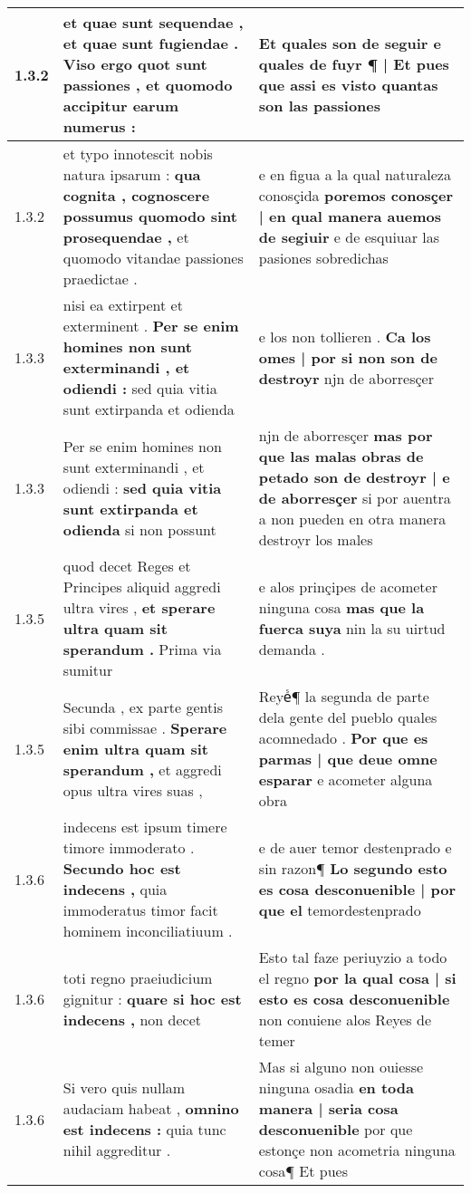 \begin{tabular}{|p{1cm}|p{6.5cm}|p{6.5cm}|}
1.3.2 & et quae sunt sequendae , \textbf{ et quae sunt fugiendae . } Viso ergo quot sunt passiones , et quomodo accipitur earum numerus : & Et quales son de seguir \textbf{ e quales de fuyr ¶ | Et pues que assi es visto } quantas son las passiones \\\hline
1.3.2 & et typo innotescit nobis natura ipsarum : \textbf{ qua cognita , cognoscere possumus quomodo sint prosequendae , } et quomodo vitandae passiones praedictae . & e en figua a la qual naturaleza conosçida \textbf{ poremos conosçer | en qual manera auemos de segiuir } e de esquiuar las pasiones sobredichas \\\hline
1.3.3 & nisi ea extirpent et exterminent . \textbf{ Per se enim homines non sunt exterminandi , et odiendi : } sed quia vitia sunt extirpanda et odienda & e los non tollieren . \textbf{ Ca los omes | por si non son de destroyr } njn de aborresçer \\\hline
1.3.3 & Per se enim homines non sunt exterminandi , et odiendi : \textbf{ sed quia vitia sunt extirpanda et odienda } si non possunt & njn de aborresçer \textbf{ mas por que las malas obras de petado son de destroyr | e de aborresçer } si por auentra a non pueden en otra manera destroyr los males \\\hline
1.3.5 & quod decet Reges et Principes aliquid aggredi ultra vires , \textbf{ et sperare ultra quam sit sperandum . } Prima via sumitur & e alos prinçipes de acometer ninguna cosa \textbf{ mas que la fuerca suya } nin la su uirtud demanda . \\\hline
1.3.5 & Secunda , ex parte gentis sibi commissae . \textbf{ Sperare enim ultra quam sit sperandum , } et aggredi opus ultra vires suas , & Reyeᷤ¶ la segunda de parte dela gente del pueblo quales acomnedado . \textbf{ Por que es parmas | que deue omne esparar } e acometer alguna obra \\\hline
1.3.6 & indecens est ipsum timere timore immoderato . \textbf{ Secundo hoc est indecens , } quia immoderatus timor facit hominem inconciliatiuum . & e de auer temor destenprado e sin razon¶ \textbf{ Lo segundo esto es cosa desconuenible | por que el } temordestenprado \\\hline
1.3.6 & toti regno praeiudicium gignitur : \textbf{ quare si hoc est indecens , } non decet & Esto tal faze periuyzio a todo el regno \textbf{ por la qual cosa | si esto es cosa desconuenible } non conuiene alos Reyes de temer \\\hline
1.3.6 & Si vero quis nullam audaciam habeat , \textbf{ omnino est indecens : } quia tunc nihil aggreditur . & Mas si alguno non ouiesse ninguna osadia \textbf{ en toda manera | seria cosa desconuenible } por que estonçe non acometria ninguna cosa¶ Et pues \\\hline

\end{tabular}
